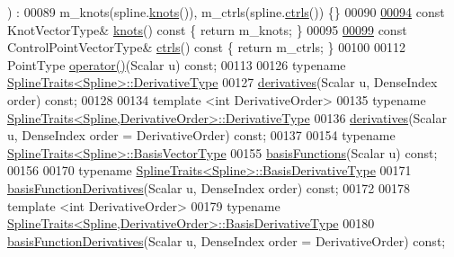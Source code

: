 \begin{DoxyCode}
      ) : 
00089     m\_knots(spline.\hyperlink{group___splines___module_ae3eac8af580ad880d8ad3a259d453aa1}{knots}()), m\_ctrls(spline.\hyperlink{group___splines___module_a0fc81e475d3a0ba34da1bd97f2e8fbc7}{ctrls}()) \{\}
00090 
\hyperlink{group___splines___module_ae3eac8af580ad880d8ad3a259d453aa1}{00094}     \textcolor{keyword}{const} KnotVectorType& \hyperlink{group___splines___module_ae3eac8af580ad880d8ad3a259d453aa1}{knots}()\textcolor{keyword}{ const }\{ \textcolor{keywordflow}{return} m\_knots; \}
00095     
\hyperlink{group___splines___module_a0fc81e475d3a0ba34da1bd97f2e8fbc7}{00099}     \textcolor{keyword}{const} ControlPointVectorType& \hyperlink{group___splines___module_a0fc81e475d3a0ba34da1bd97f2e8fbc7}{ctrls}()\textcolor{keyword}{ const }\{ \textcolor{keywordflow}{return} m\_ctrls; \}
00100 
00112     PointType \hyperlink{group___splines___module_a3c7e1838eae4ee7e341ef9d3dbf9ba45}{operator()}(Scalar u) \textcolor{keyword}{const};
00113 
00126     \textcolor{keyword}{typename} \hyperlink{struct_eigen_1_1_spline_traits}{SplineTraits<Spline>::DerivativeType}
00127       \hyperlink{group___splines___module_a196730cf190dfa16907db888277e5aed}{derivatives}(Scalar u, DenseIndex order) \textcolor{keyword}{const};
00128 
00134     \textcolor{keyword}{template} <\textcolor{keywordtype}{int} DerivativeOrder>
00135     \textcolor{keyword}{typename} \hyperlink{struct_eigen_1_1_spline_traits}{SplineTraits<Spline,DerivativeOrder>::DerivativeType}
00136       \hyperlink{group___splines___module_a196730cf190dfa16907db888277e5aed}{derivatives}(Scalar u, DenseIndex order = DerivativeOrder) \textcolor{keyword}{const};
00137 
00154     \textcolor{keyword}{typename} \hyperlink{struct_eigen_1_1_spline_traits}{SplineTraits<Spline>::BasisVectorType}
00155       \hyperlink{group___splines___module_afe0997f0bb02a3fac3073016abac04c6}{basisFunctions}(Scalar u) \textcolor{keyword}{const};
00156 
00170     \textcolor{keyword}{typename} \hyperlink{struct_eigen_1_1_spline_traits}{SplineTraits<Spline>::BasisDerivativeType}
00171       \hyperlink{group___splines___module_a17d416e814d1ee957e5b309dc423751f}{basisFunctionDerivatives}(Scalar u, DenseIndex order) \textcolor{keyword}{const};
00172 
00178     \textcolor{keyword}{template} <\textcolor{keywordtype}{int} DerivativeOrder>
00179     \textcolor{keyword}{typename} \hyperlink{struct_eigen_1_1_spline_traits}{SplineTraits<Spline,DerivativeOrder>::BasisDerivativeType}
00180       \hyperlink{group___splines___module_a17d416e814d1ee957e5b309dc423751f}{basisFunctionDerivatives}(Scalar u, DenseIndex order = DerivativeOrder) \textcolor{keyword}{const};

\end{DoxyCode}
